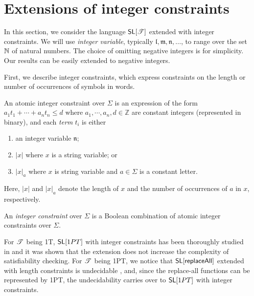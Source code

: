 \section{Extensions of integer constraints}
\label{sec:extensions}

In this section, we consider the language $\mathsf{SL}[\mathscr{T}]$ extended with integer constraints.
We will use %
\emph{integer variable}, typically $\mathfrak{l}, \mathfrak{m}, \mathfrak{n}, \ldots$, to range over the set $\mathbb{N}$ of natural numbers. %
The
choice of omitting negative integers is for simplicity. Our
results can be easily extended to negative integers.

First, we describe integer constraints, which express constraints on the length or number of occurrences of symbols in words. 


\begin{definition} \label{def:intconst} 
	An atomic integer constraint over $\Sigma$ is an expression of the form
	$a_1t_1+\cdots+a_nt_n\leq d$
	where $a_1, \cdots, a_n,d\in \mathbb{Z}$ are constant integers (represented in binary), and each \emph{term} $t_i$ is either 
	\begin{enumerate}
		\item an integer variable $\mathfrak{n}$;
		\item $|x|$ where $x$ is a  string variable; or 
		\item $|x|_a$ where $x$ is string variable and $a\in \Sigma$ is a constant letter.
	\end{enumerate}
	Here, $|x|$ and $|x|_a$ denote the length of $x$ and the number of occurrences of $a$ in $x$, respectively. 
	
	An \emph{integer constraint} over $\Sigma$ is a Boolean combination of atomic integer constraints over $\Sigma$.
\end{definition}
For $\mathscr{T}$ being 1T, $\mathsf{SL}[1PT]$ with integer constraints has been thoroughly studied in \cite{LB16} and it was shown that the extension does not increase the complexity of satisfiability checking. For $\mathscr{T}$ being 1PT, we notice that $\mathsf{SL}[\mathsf{replaceAll}]$ extended with length constraints is undecidable \cite{CCHLW18}, and, since the replace-all functions can be represented by 1PT, the undecidability carries over to $\mathsf{SL}[1PT]$ with integer constraints. 

